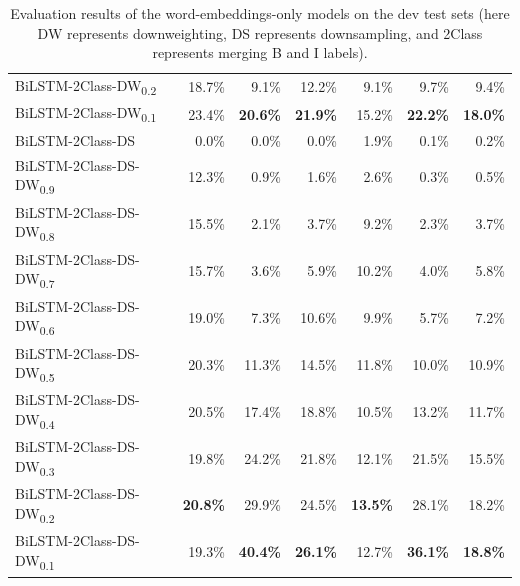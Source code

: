 \documentclass[11pt,a4paper]{article}
\begin{document}
\begin{table}
\begin{tabular}{lrrrrrr}
        BiLSTM-2Class-DW\textsubscript{0.2} & 18.7\% &  9.1\% & 12.2\% &  9.1\% &  9.7\% &  9.4\% \\
        BiLSTM-2Class-DW\textsubscript{0.1} & 23.4\% & \textbf{20.6\%} & \textbf{21.9\%} & 15.2\% & \textbf{22.2\%} & \textbf{18.0\%} \\
        \hline
        BiLSTM-2Class-DS & 0.0\% & 0.0\% & 0.0\% & 1.9\% & 0.1\% & 0.2\% \\
        BiLSTM-2Class-DS-DW\textsubscript{0.9} & 12.3\% &  0.9\% &  1.6\% &  2.6\% &  0.3\% &  0.5\% \\
        BiLSTM-2Class-DS-DW\textsubscript{0.8} & 15.5\% &  2.1\% &  3.7\% &  9.2\% &  2.3\% &  3.7\% \\
        BiLSTM-2Class-DS-DW\textsubscript{0.7} & 15.7\% &  3.6\% &  5.9\% & 10.2\% &  4.0\% &  5.8\% \\
        BiLSTM-2Class-DS-DW\textsubscript{0.6} & 19.0\% &  7.3\% & 10.6\% &  9.9\% &  5.7\% &  7.2\% \\
        BiLSTM-2Class-DS-DW\textsubscript{0.5} & 20.3\% & 11.3\% & 14.5\% & 11.8\% & 10.0\% & 10.9\% \\
        BiLSTM-2Class-DS-DW\textsubscript{0.4} & 20.5\% & 17.4\% & 18.8\% & 10.5\% & 13.2\% & 11.7\% \\
        BiLSTM-2Class-DS-DW\textsubscript{0.3} & 19.8\% & 24.2\% & 21.8\% & 12.1\% & 21.5\% & 15.5\% \\
        BiLSTM-2Class-DS-DW\textsubscript{0.2} & \textbf{20.8\%} & 29.9\% & 24.5\% & \textbf{13.5\%} & 28.1\% & 18.2\% \\
        BiLSTM-2Class-DS-DW\textsubscript{0.1} & 19.3\% & \textbf{40.4\%} & \textbf{26.1\%} & 12.7\% & \textbf{36.1\%} & \textbf{18.8\%} \\
        \hline
    \end{tabular}
    \caption{Evaluation results of the word-embeddings-only models on the dev test sets (here DW represents downweighting, DS represents downsampling, and 2Class represents merging B and I labels).}
    \label{table:eval-results}
\end{table}
\end{document}
